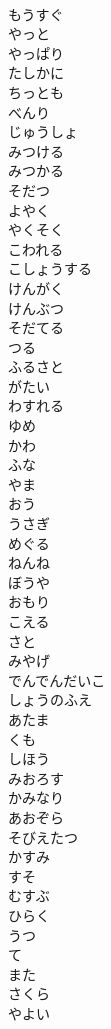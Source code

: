 \documentclass[8pt]{extreport}
\begin{document}
\begin{CJK}{UTF8}{min}
\\	もうすぐ
\\	やっと
\\	やっぱり
\\	たしかに
\\	ちっとも
\\	べんり
\\	じゅうしょ
\\	みつける
\\	みつかる
\\	そだつ
\\	よやく
\\	やくそく
\\	こわれる
\\	こしょうする
\\	けんがく
\\	けんぶつ
\\	そだてる
\\	つる
\\	ふるさと
\\	がたい
\\	わすれる
\\	ゆめ
\\	かわ
\\	ふな
\\	やま
\\	おう
\\	うさぎ
\\	めぐる
\\	ねんね
\\	ぼうや
\\	おもり
\\	こえる
\\	さと
\\	みやげ
\\	でんでんだいこ
\\	しょうのふえ
\\	あたま
\\	くも
\\	しほう
\\	みおろす
\\	かみなり
\\	あおぞら
\\	そびえたつ
\\	かすみ
\\	すそ
\\	むすぶ
\\	ひらく
\\	うつ
\\	て
\\	また
\\	さくら
\\	やよい

\end{CJK}
\end{document}
